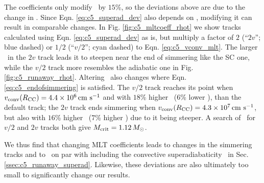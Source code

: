 
The \citeal{stev79} coefficients only modify \vconv\ by $15$\%, so the deviations above are due to the change in \deltanab.  Since Eqn. \ref{eq:c5_superad_dev} also depends on \vconv, modifying it can result in comparable changes.  In Fig. \ref{fig:c5_mltcoeff_rhot} we show tracks calculated using Eqn. \ref{eq:c5_superad_dev} as is, but multiply a factor of $2$ (``$2v$''; blue dashed) or $1/2$ (``$v/2$''; cyan dashed) to Eqn. \ref{eq:c5_vconv_mlt}.  The larger \deltanab\ in the $2v$ track leads it to steepen near the end of simmering like the SC one, while the $v/2$ track more resembles the adiabatic one in Fig. \ref{fig:c5_runaway_rhot}.  Altering \vconv\ also changes where Eqn. \ref{eq:c5_endofsimmering} is satisfied.  The $v/2$ track reaches its \citeal{wooswk04} point when $\vconvrcc = 4.4\times10^6\,\cmpsec$ and with $18$\% higher \rhoc\ ($6$\% lower \Tc), than the default track; the $2v$ track ends simmering when $\vconvrcc = 4.3\times10^7\,\cmpsec$, but also with $16$\% higher \rhoc\ ($7$\% higher \Tc) due to it being steeper.  A search of \Mcrit\ for $v/2$ and $2v$ tracks both give $\Mcrit = 1.12\,\Msun$.



We thus find that changing MLT coefficients leads to changes in the simmering tracks and to \Mcrit\ on par with including the convective superadiabaticity \dnabconv\ in Sec. \ref{ssec:c5_runaway_superad}.  Likewise, these deviations are also ultimately too small to significantly change our results.



